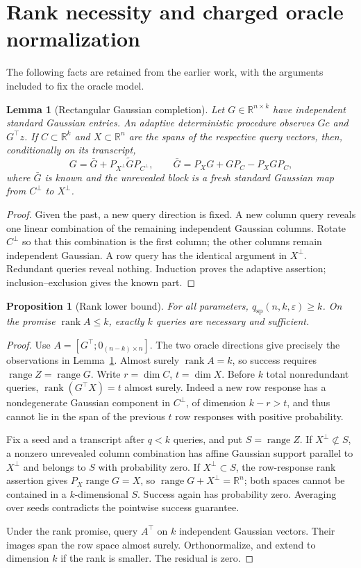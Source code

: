 \documentclass[11pt]{article}
\numberwithin{equation}{section}
\newtheorem{lemma}[theorem]{Lemma}
\newtheorem{proposition}[theorem]{Proposition}
\theoremstyle{remark}\newtheorem{remark}[theorem]{Remark}
\newcommand{\R}{\mathbb R}
\newcommand{\eps}{\varepsilon}
\newcommand{\qsp}{q_{\mathrm{sp}}}
\newcommand{\rank}{\operatorname{rank}}
\newcommand{\range}{\operatorname{range}}
\begin{document}
\section{Rank necessity and charged oracle normalization}\label{sec:rank}
The following facts are retained from the earlier work, with the arguments included to fix the oracle model.

\begin{lemma}[Rectangular Gaussian completion]\label{lem:rectcompletion}
Let $G\in\R^{n\times k}$ have independent standard Gaussian entries. An adaptive deterministic procedure observes $Gc$ and $G^\top z$. If $C\subset\R^k$ and $X\subset\R^n$ are the spans of the respective query vectors, then, conditionally on its transcript,
\[
G=\bar G+P_{X^\perp}\widetilde G P_{C^\perp},\qquad
\bar G=P_XG+GP_C-P_XGP_C,
\]
where $\bar G$ is known and the unrevealed block is a fresh standard Gaussian map from $C^\perp$ to $X^\perp$.
\end{lemma}
\begin{proof}
Given the past, a new query direction is fixed. A new column query reveals one linear combination of the remaining independent Gaussian columns. Rotate $C^\perp$ so that this combination is the first column; the other columns remain independent Gaussian. A row query has the identical argument in $X^\perp$. Redundant queries reveal nothing. Induction proves the adaptive assertion; inclusion--exclusion gives the known part.
\end{proof}

\begin{proposition}[Rank lower bound]\label{prop:rank}
For all parameters, $\qsp(n,k,\eps)\ge k$. On the promise $\rank A\le k$, exactly $k$ queries are necessary and sufficient.
\end{proposition}
\begin{proof}
Use $A=[G^\top;0_{(n-k)\times n}]$. The two oracle directions give precisely the observations in Lemma~\ref{lem:rectcompletion}. Almost surely $\rank A=k$, so success requires $\range Z=\range G$.
Write $r=\dim C$, $t=\dim X$. Before $k$ total nonredundant queries, $\rank(G^\top X)=t$ almost surely. Indeed a new row response has a nondegenerate Gaussian component in $C^\perp$, of dimension $k-r>t$, and thus cannot lie in the span of the previous $t$ row responses with positive probability.

Fix a seed and a transcript after $q<k$ queries, and put $S=\range Z$. If $X^\perp\not\subset S$, a nonzero unrevealed column combination has affine Gaussian support parallel to $X^\perp$ and belongs to $S$ with probability zero. If $X^\perp\subset S$, the row-response rank assertion gives $P_X\range G=X$, so $\range G+X^\perp=\R^n$; both spaces cannot be contained in a $k$-dimensional $S$. Success again has probability zero. Averaging over seeds contradicts the pointwise success guarantee.

Under the rank promise, query $A^\top$ on $k$ independent Gaussian vectors. Their images span the row space almost surely. Orthonormalize, and extend to dimension $k$ if the rank is smaller. The residual is zero.
\end{proof}
\end{document}
